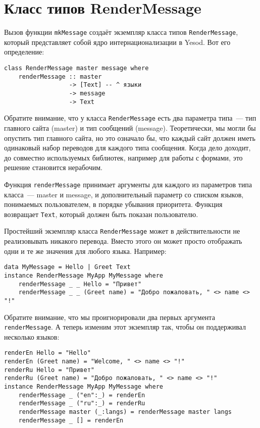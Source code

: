 \section{Класс типов RenderMessage}

Вызов функции \lstinline'mkMessage' создаёт экземпляр класса типов
\lstinline'RenderMessage', который представляет собой ядро интернационализации
в Yesod. Вот его определение:

\begin{lstlisting}
class RenderMessage master message where
    renderMessage :: master
                  -> [Text] -- ^ языки
                  -> message
                  -> Text
\end{lstlisting}

Обратите внимание, что у класса \lstinline'RenderMessage' есть два параметра
типа~--- тип главного сайта (master) и тип сообщений (message). Теоретически,
мы могли бы опустить тип главного сайта, но это означало бы, что каждый сайт
должен иметь одинаковый набор переводов для каждого типа сообщения. Когда дело
доходит, до совместно используемых библиотек, например для работы с формами,
это решение становится нерабочим.

Функция \lstinline'renderMessage' принимает аргументы для каждого из параметров
типа класса~--- master и message, и дополнительный параметр со списком языков,
понимаемых пользователем, в порядке убывания приоритета. Функция возвращает
\lstinline'Text', который должен быть показан пользователю.

Простейший экземпляр класса \lstinline'RenderMessage' может в действительности
не реализовывать никакого перевода. Вместо этого он может просто отображать
одни и те же значения для любого языка. Например:

\begin{lstlisting}
data MyMessage = Hello | Greet Text
instance RenderMessage MyApp MyMessage where
    renderMessage _ _ Hello = "Привет"
    renderMessage _ _ (Greet name) = "Добро пожаловать, " <> name <> "!"
\end{lstlisting}

Обратите внимание, что мы проигнорировали два первых аргумента
\lstinline'renderMessage'. А теперь изменим этот экземпляр так, чтобы он
поддерживал несколько языков:

\begin{lstlisting}
renderEn Hello = "Hello"
renderEn (Greet name) = "Welcome, " <> name <> "!"
renderRu Hello = "Привет"
renderRu (Greet name) = "Добро пожаловать, " <> name <> "!"
instance RenderMessage MyApp MyMessage where
    renderMessage _ ("en":_) = renderEn
    renderMessage _ ("ru":_) = renderRu
    renderMessage master (_:langs) = renderMessage master langs
    renderMessage _ [] = renderEn
\end{lstlisting}

